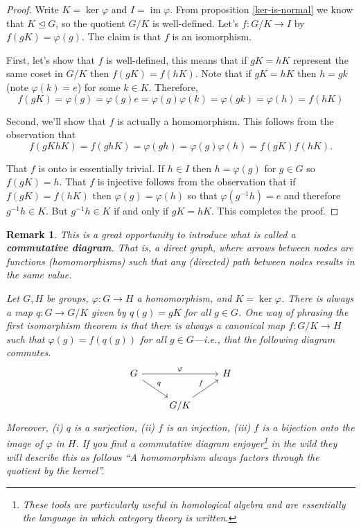 \documentclass[12pt]{article}
\numberwithin{equation}{subsection}
\theoremstyle{note}
\newtheorem{remark}[subsection]{Remark}
\newcommand{\nrml}{\trianglelefteq}
\newcommand{\img}{\operatorname{im}}
\begin{document}
\begin{proof}
	Write $K=\ker\varphi$ and $I=\img\varphi$. From proposition \ref{ker-is-normal} we know that $K\nrml G$, so the quotient $G/K$ is well-defined. Let's $f\colon G/K \to I$ by $f(gK)=\varphi(g)$. The claim is that $f$ is an isomorphism. 
	
	First, let's show that $f$ is well-defined, this means that if $gK=hK$ represent the same coset in $G/K$ then $f(gK)=f(hK)$. Note that if $gK=hK$ then $h=gk$ (note $\varphi(k)=e$) for some $k\in K$. Therefore, \[f(gK)=\varphi(g)=\varphi(g)e=\varphi(g)\varphi(k)=\varphi(gk)=\varphi(h)=f(hK)\]

	Second, we'll show that $f$ is actually a homomorphism. This follows from the observation that \[ f(gKhK)=f(ghK)=\varphi(gh)=\varphi(g)\varphi(h)=f(gK)f(hK).\]
	
	That $f$ is onto is essentially trivial. If $h\in I$ then $h=\varphi(g)$ for $g\in G$ so $f(gK)=h$. That $f$ is injective follows from the observation that if $f(gK)=f(hK)$ then $\varphi(g)=\varphi(h)$ so that $\varphi(g^{-1}h)=e$ and therefore $g^{-1}h\in K$. But $g^{-1}h\in K$ if and only if $gK=hK$. This completes the proof. 
\end{proof}

\begin{remark}
This is a great opportunity to introduce what is called a \textbf{commutative diagram}. That is, a direct graph, where arrows between nodes are functions (homomorphisms) such that any (directed) path between nodes results in the same value. 

Let $G,H$ be groups, $\varphi\colon G\to H$ a homomorphism, and $K=\ker\varphi$. There is always a map $q\colon G\to G/K$ given by $q(g)=gK$ for all $g\in G$. One way of phrasing the first isomorphism theorem is that there is always a canonical map $f\colon G/K\to H$ such that $\varphi(g)=f(q(g))$ for all $g\in G$---i.e., that the following diagram commutes. 
\[\begin{tikzcd}
	G \arrow{rr}{\varphi} \arrow{rd}{q} && H \\
 &G/K \arrow{ru}{f}&
\end{tikzcd}\]
Moreover, (i) $q$ is a surjection, (ii) $f$ is an injection, (iii) $f$ is a bijection onto the image of $\varphi$ in $H$. If you find a commutative diagram enjoyer\footnote{These tools are particularly useful in homological algebra and are essentially \textit{the} language in which category theory is written.} in  the wild they will describe this as follows ``\textit{A homomorphism always factors through the quotient by the kernel}''.
\end{remark}
\end{document}

